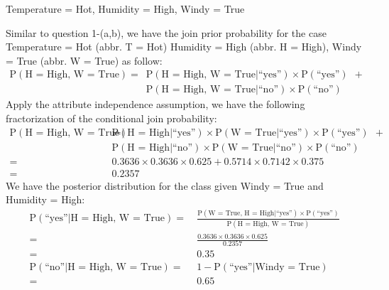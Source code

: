 \documentclass[12pt,twoside]{article}
\begin{document}
\begin{exercises}
\begin{exerciseparts}
  \exercisepart Temperature = Hot, Humidity = High, Windy = True

  \ifsolution \solution{}
    Similar to question 1-(a,b), we have the join prior probability
    for the case Temperature = Hot (abbr. T = Hot) Humidity = High 
    (abbr. H = High), Windy = True (abbr. W = True) as follow:
    \begin{equation*}
      \begin{aligned}
        \mbox{P}(\mbox{H = High, W = True}) 
          = \ & \mbox{P}(\mbox{H = High, W = True}|\mbox{``yes''})  \times \mbox{P}(\mbox{``yes''})\ \ + \\
            & \mbox{P}(\mbox{H = High, W = True}|\mbox{``no''})  \times \mbox{P}(\mbox{``no''})
      \end{aligned}
    \end{equation*}
    Apply the attribute independence assumption, we have the following
    fractorization of the conditional join probability:
    \begin{equation*}
      \begin{aligned}
        \mbox{P}(\mbox{H = High, W = True}) 
          = \ & \mbox{P}(\mbox{H = High}|\mbox{``yes''}) \times 
                \mbox{P}(\mbox{W = True}|\mbox{``yes''}) \times \mbox{P}(\mbox{``yes''})\ \ + \\
              & \mbox{P}(\mbox{H = High}|\mbox{``no''}) \times
                \mbox{P}(\mbox{W = True}|\mbox{``no''}) \times \mbox{P}(\mbox{``no''}) \\
          = \ & 0.3636 \times 0.3636 \times 0.625 + 0.5714 \times 0.7142 \times 0.375 \\
          = \ & 0.2357
      \end{aligned}
    \end{equation*}
    We have the posterior distribution for the class given Windy = True and Humidity = High:
    \begin{equation*}
      \begin{aligned}
        \mbox{P}(\mbox{``yes''} | \mbox{H = High, W = True}) 
        = & \ \frac{\mbox{P}(\mbox{W = True, H = High} | \mbox{``yes''}) \times
        \mbox{P}(\mbox{``yes''})}{\mbox{P}(\mbox{H = High, W = True})} \\
        = & \ \frac{0.3636 \times 0.3636 \times 0.625}{0.2357} \\
        = & \ \boldsymbol{0.35} \\
        \mbox{P}(\mbox{``no''} | \mbox{H = High, W = True}) 
        = & \ 1 - \mbox{P}(\mbox{``yes''} | \mbox{Windy = True})  \\
        = & \ \boldsymbol{0.65}
      \end{aligned}
    \end{equation*}
  \fi
\end{exerciseparts}


\end{exercises}
\end{document}
